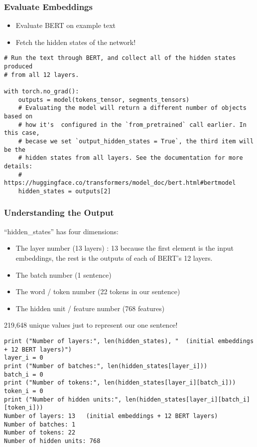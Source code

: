 \begin{frame}[fragile]\frametitle{Evaluate Embeddings}
\begin{itemize}
\item Evaluate BERT on example text
\item Fetch the hidden states of the network!
\end{itemize}


\begin{lstlisting}
# Run the text through BERT, and collect all of the hidden states produced
# from all 12 layers. 

with torch.no_grad():
    outputs = model(tokens_tensor, segments_tensors)
    # Evaluating the model will return a different number of objects based on 
    # how it's  configured in the `from_pretrained` call earlier. In this case, 
    # becase we set `output_hidden_states = True`, the third item will be the 
    # hidden states from all layers. See the documentation for more details:
    # https://huggingface.co/transformers/model_doc/bert.html#bertmodel
    hidden_states = outputs[2]
\end{lstlisting}

\end{frame}

\begin{frame}[fragile]\frametitle{Understanding the Output}

``hidden\_states'' has four dimensions:

\begin{itemize}
\item The layer number (13 layers) : 13 because the first element is the input embeddings, the rest is the outputs of each of BERT’s 12 layers.
\item The batch number (1 sentence)
\item The word / token number (22 tokens in our sentence)
\item The hidden unit / feature number (768 features)
\end{itemize}

219,648 unique values just to represent our one sentence!

\begin{lstlisting}
print ("Number of layers:", len(hidden_states), "  (initial embeddings + 12 BERT layers)")
layer_i = 0
print ("Number of batches:", len(hidden_states[layer_i]))
batch_i = 0
print ("Number of tokens:", len(hidden_states[layer_i][batch_i]))
token_i = 0
print ("Number of hidden units:", len(hidden_states[layer_i][batch_i][token_i]))
Number of layers: 13   (initial embeddings + 12 BERT layers)
Number of batches: 1
Number of tokens: 22
Number of hidden units: 768
\end{lstlisting}

\end{frame}

